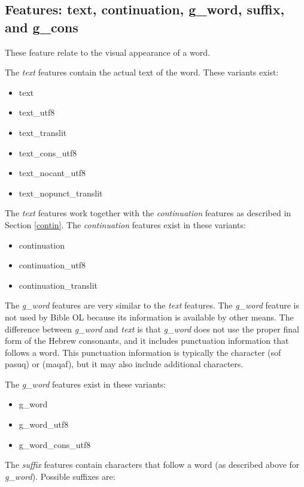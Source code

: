 \documentclass[11pt,oneside,a4paper]{memoir}
\newcommand{\heb}[1]{{\RL {\ezr #1}}}
\begin{document}
\subsection{Features: text, continuation, g\_word, suffix, and g\_cons}\label{suffix}

These feature relate to the visual appearance of a word.

The \emph{text} features contain the actual text of the word. These variants exist:

\begin{itemize}
\item text
\item text\_utf8
\item text\_translit
\item text\_cons\_utf8
\item text\_nocant\_utf8
\item text\_nopunct\_translit
\end{itemize}

The \emph{text} features work together with the \emph{continuation} features as described in Section
\ref{contin}. The \emph{continuation} features exist
in these variants:

\begin{itemize}
\item continuation
\item continuation\_utf8
\item continuation\_translit
\end{itemize}

The \emph{g\_word} features are very similar to the \emph{text} features.
The \emph{g\_word} feature is not used by Bible OL because its information is available by other means. The
difference between \emph{g\_word} and \emph{text} is that \emph{g\_word} does not use the proper final form of the Hebrew
consonants, and it includes punctuation information that follows a word. This punctuation information
is typically the character \heb{׃} (sof pasuq) or \heb{־} (maqaf), but it may also include
additional characters.

The \emph{g\_word} features exist in these variants:

\begin{itemize}
\item g\_word
\item g\_word\_utf8
\item g\_word\_cons\_utf8
\end{itemize}

The \emph{suffix} features contain characters that follow a word (as
described above for \emph{g\_word}). Possible suffixes are:
\end{document}
